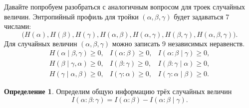 \documentclass[12pt]{article}
\theoremstyle{definition}
\newtheorem{definition}{Определение}
\theoremstyle{plain}
\theoremstyle{remark}
\begin{document}
Давайте попробуем разобраться с аналогичным вопросом для троек случайных
величин. Энтропийный профиль для тройки $(\alpha,\beta,\gamma)$ будет задаваться 7 числами:
\[
\bigl(H(\alpha),H(\beta),H(\gamma),H(\alpha,\beta),H(\alpha,\gamma),
H(\beta,\gamma),H(\alpha,\beta,\gamma)\bigr).
\]
Для случайных величин $(\alpha,\beta,\gamma)$ можно записать 9 независимых
неравенств.
\begin{equation*}
\begin{array}{lll}
H(\alpha\mid\beta,\gamma)\ge 0, & I(\alpha:\beta )\ge 0, & I(\alpha:\beta\mid\gamma) \ge 0,\\
H(\beta\mid\gamma,\alpha)\ge 0, & I(\beta:\gamma )\ge 0, & I(\beta:\gamma\mid\alpha) \ge 0,\\
H(\gamma\mid\alpha,\beta)\ge 0, & I(\gamma:\alpha)\ge 0, & I(\gamma:\alpha\mid\beta) \ge 0.
\end{array}
\end{equation*}
\begin{definition}
Определим общую информацию трёх случайных величин
\[
    I(\alpha:\beta:\gamma) = I(\alpha:\beta) - I(\alpha:\beta\mid\gamma).
\]
\end{definition}
\end{document}
